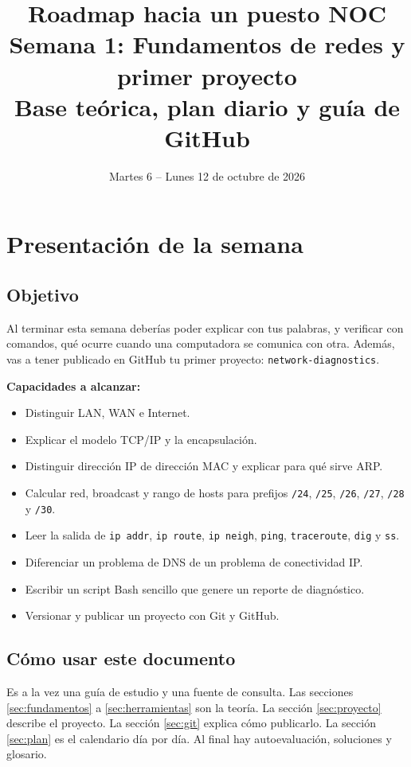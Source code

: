 \documentclass[11pt,a4paper]{article}
\title{\textbf{Roadmap hacia un puesto NOC}\\[0.3em]
\Large Semana 1: Fundamentos de redes y primer proyecto\\[0.2em]
\large Base teórica, plan diario y guía de GitHub}
\author{}
\date{Martes 6 -- Lunes 12 de octubre de 2026}
\theoremstyle{definition}
\theoremstyle{remark}
\newcommand{\cmd}[1]{\texttt{#1}}
\begin{document}
\maketitle
\thispagestyle{fancy}

\tableofcontents
\newpage

\section{Presentación de la semana}

\subsection{Objetivo}

Al terminar esta semana deberías poder explicar con tus palabras, y verificar con comandos, qué ocurre cuando una computadora se comunica con otra. Además, vas a tener publicado en GitHub tu primer proyecto: \texttt{network-diagnostics}.

\textbf{Capacidades a alcanzar:}
\begin{itemize}
  \item Distinguir LAN, WAN e Internet.
  \item Explicar el modelo TCP/IP y la encapsulación.
  \item Distinguir dirección IP de dirección MAC y explicar para qué sirve ARP.
  \item Calcular red, broadcast y rango de hosts para prefijos \texttt{/24}, \texttt{/25}, \texttt{/26}, \texttt{/27}, \texttt{/28} y \texttt{/30}.
  \item Leer la salida de \cmd{ip addr}, \cmd{ip route}, \cmd{ip neigh}, \cmd{ping}, \cmd{traceroute}, \cmd{dig} y \cmd{ss}.
  \item Diferenciar un problema de DNS de un problema de conectividad IP.
  \item Escribir un script Bash sencillo que genere un reporte de diagnóstico.
  \item Versionar y publicar un proyecto con Git y GitHub.
\end{itemize}

\subsection{Cómo usar este documento}

Es a la vez una guía de estudio y una fuente de consulta. Las secciones \ref{sec:fundamentos} a \ref{sec:herramientas} son la teoría. La sección \ref{sec:proyecto} describe el proyecto. La sección \ref{sec:git} explica cómo publicarlo. La sección \ref{sec:plan} es el calendario día por día. Al final hay autoevaluación, soluciones y glosario.
\end{document}
